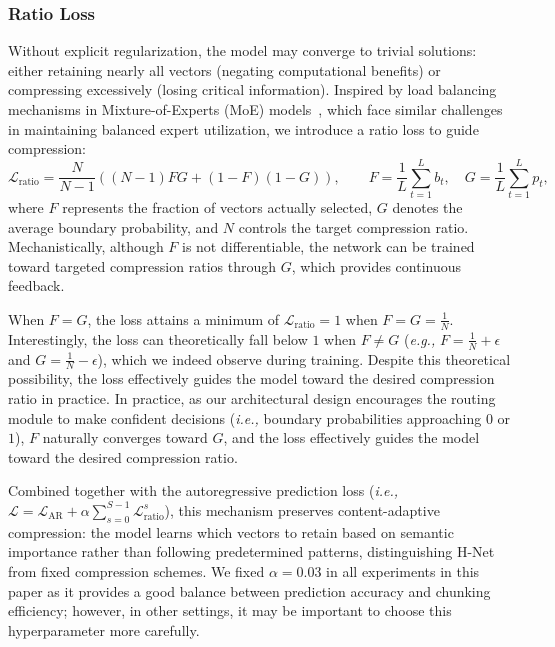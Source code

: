 \documentclass{article}
\newcommand{\citep}{\parencite}
\newcommand{\model}{H-Net}
\newcommand{\router}{routing module}
\newcommand{\ie}{\emph{i.e.,}}
\newcommand{\eg}{\emph{e.g.,}}
\theoremstyle{plain}
\theoremstyle{remark}
\begin{document}
\subsubsection{Ratio Loss}

Without explicit regularization, the model may converge to trivial solutions: either retaining nearly all vectors (negating computational benefits) or compressing excessively (losing critical information).
Inspired by load balancing mechanisms in Mixture-of-Experts (MoE) models~\citep{MoE}, which face similar challenges in maintaining balanced expert utilization, we introduce a ratio loss to guide compression:
\begin{equation}
    \label{eq: ratio_loss}
    \mathcal{L}_\text{ratio} = \frac{N}{N-1} \left( (N-1) FG + (1-F) (1-G) \right), \qquad F = \frac{1}{L}\sum_{t=1}^{L} b_t, \quad G = \frac{1}{L}\sum_{t=1}^{L} p_t,
\end{equation}
where $F$ represents the fraction of vectors actually selected, $G$ denotes the average boundary probability, and $N$ controls the target compression ratio.
Mechanistically, although $F$ is not differentiable, the network can be trained toward targeted compression ratios through $G$, which provides continuous feedback.

When $F = G$, the loss attains a minimum of $\mathcal{L}_\text{ratio}=1$ when $F = G = \frac{1}{N}$.
Interestingly, the loss can theoretically fall below $1$ when $F \neq G$ (\eg{} $F = \frac{1}{N} + \epsilon$ and $G = \frac{1}{N} - \epsilon$), which we indeed observe during training.
Despite this theoretical possibility, the loss effectively guides the model toward the desired compression ratio in practice.
In practice, as our architectural design encourages the \router{} to make confident decisions (\ie{} boundary probabilities approaching $0$ or $1$), $F$ naturally converges toward $G$, and the loss effectively guides the model toward the desired compression ratio.

Combined together with the autoregressive prediction loss (\ie{} $\mathcal{L} = \mathcal{L}_\text{AR} + \alpha \sum_{s=0}^{S-1} \mathcal{L}_\text{ratio}^{s}$), this mechanism preserves content-adaptive compression: the model learns which vectors to retain based on semantic importance rather than following predetermined patterns, distinguishing \model{} from fixed compression schemes.
We fixed $\alpha = 0.03$ in all experiments in this paper as it provides a good balance between prediction accuracy and chunking efficiency; however, in other settings, it may be important to choose this hyperparameter more carefully.
\end{document}

